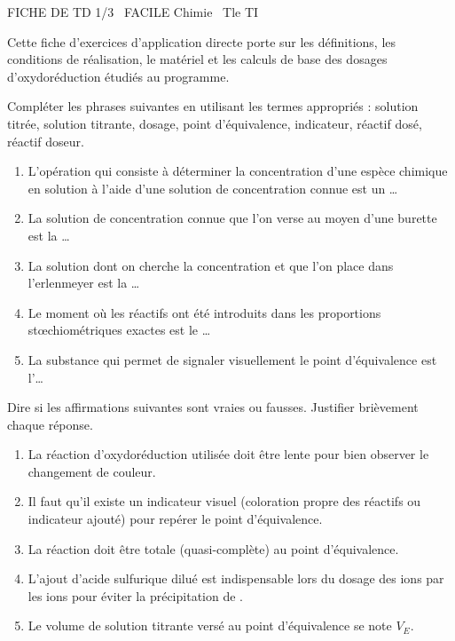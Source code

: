 \documentclass[11pt]{article}
\begin{document}
\begin{tcolorbox}[enhanced,colback=popink,colframe=popink,arc=10pt,boxrule=0pt,left=12pt,right=12pt,top=9pt,bottom=9pt]
{\color{white}\popxbold\small FICHE DE TD 1/3 \textbullet\ FACILE \hfill Chimie \textbullet\ Tle TI\par}
\end{tcolorbox}
\vspace{4pt}
Cette fiche d'exercices d'application directe porte sur les définitions, les conditions de réalisation, le matériel et les calculs de base des dosages d'oxydoréduction étudiés au programme.

\begin{exercice}
Compléter les phrases suivantes en utilisant les termes appropriés : solution titrée, solution titrante, dosage, point d'équivalence, indicateur, réactif dosé, réactif doseur.
\begin{enumerate}
    \item L'opération qui consiste à déterminer la concentration d'une espèce chimique en solution à l'aide d'une solution de concentration connue est un \ldots
    \item La solution de concentration connue que l'on verse au moyen d'une burette est la \ldots
    \item La solution dont on cherche la concentration et que l'on place dans l'erlenmeyer est la \ldots
    \item Le moment où les réactifs ont été introduits dans les proportions stœchiométriques exactes est le \ldots
    \item La substance qui permet de signaler visuellement le point d'équivalence est l'\ldots
\end{enumerate}
\end{exercice}

\begin{exercice}
Dire si les affirmations suivantes sont vraies ou fausses. Justifier brièvement chaque réponse.
\begin{enumerate}
    \item La réaction d'oxydoréduction utilisée doit être lente pour bien observer le changement de couleur.
    \item Il faut qu'il existe un indicateur visuel (coloration propre des réactifs ou indicateur ajouté) pour repérer le point d'équivalence.
    \item La réaction doit être totale (quasi-complète) au point d'équivalence.
    \item L'ajout d'acide sulfurique dilué est indispensable lors du dosage des ions  par les ions  pour éviter la précipitation de .
    \item Le volume de solution titrante versé au point d'équivalence se note $V_E$.
\end{enumerate}
\end{exercice}
\end{document}
